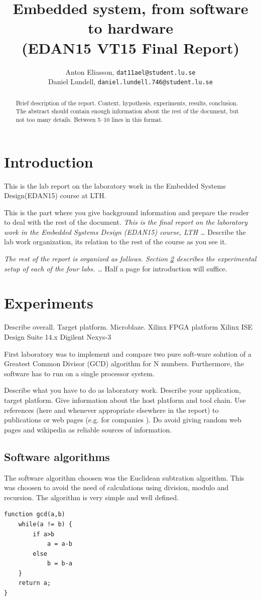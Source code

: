 \documentclass[11pt]{article}
\title{Embedded system, from software to hardware\\\small{(EDAN15 VT15 Final Report)}}
\author{
Anton Eliasson, \texttt{dat11ael@student.lu.se}\\
Daniel Lundell, \texttt{daniel.lundell.746@student.lu.se}
}
\begin{document}
\lstset{
	language=C,
	captionpos=b,
	basicstyle=\footnotesize\ttfamily
}

\maketitle

\begin{abstract}
Brief description of the report. Context, hypothesis, experiments, results, conclusion. The abstract should contain enough
information about the rest of the document, but not too many details. Between 5--10 lines in this format.
\end{abstract}
\section{Introduction}
This is the lab report on the laboratory work in the Embedded Systems Design(EDAN15) course at LTH.


This is the part where you give background information and prepare the reader to deal with the rest of the document. \textit{This is the final report on the laboratory work in the Embedded Systems Design (EDAN15) course, LTH \ldots} Describe the lab work organization, its relation to the rest of the course as you see it.

\textit{The rest of the report is organized as follows. Section \ref{sec:exp} describes the experimental setup of each of the four labs. \ldots} Half a page for introduction will suffice.
\section{Experiments}\label{sec:exp}
Describe overall. Target platform. Microblaze. Xilinx FPGA platform Xilinx ISE Design Suite 14.x Digilent Nexys-3

First laboratory was to implement and compare two pure soft-ware solution of a Greatest Common Divisor (GCD) algorithm for N numbers. Furthermore, the software has to run on a single processor system.


Describe what you have to do as laboratory work. Describe your application, target platform. Give information about the host platform and tool chain. Use references (here and whenever appropriate elsewhere in the report) to publications \cite{microblaze} or web pages (e.g. for companies \cite{xilinx}). Do avoid giving random web pages and wikipedia as reliable sources of information.
\subsection{Software algorithms}
The software algorithm choosen was the Euclidean subtration algorithm. This was choosen to avoid the need of calculations using division, modulo and recursion. The algorithm is very simple and well defined. 
\begin{lstlisting}[float=tbh,frame=tb,captionpos=b,caption={Working on your report},label=lst:example]
function gcd(a,b)
	while(a != b) {
		if a>b
			a = a-b
		else
			b = b-a
	}
	return a;
}
\end{lstlisting}
\end{document}
